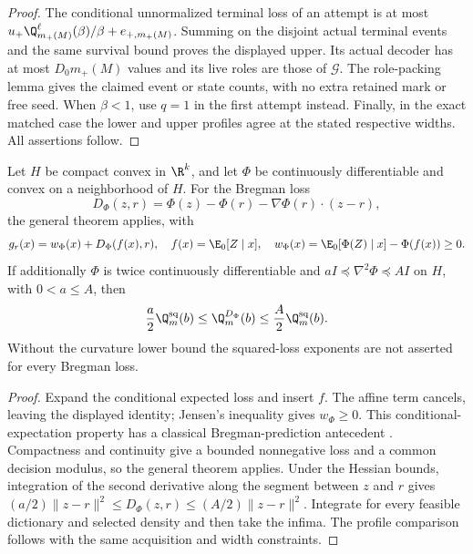 \begin{proof}
The conditional unnormalized terminal loss of an attempt is at most $u_+\Q_{m_+(M)}^\ell(\beta)/\beta+e_{+,m_+(M)}$. Summing on the disjoint actual terminal events and the same survival bound proves the displayed upper. Its actual decoder has at most $D_0m_+(M)$ values and its live roles are those of $\mathcal G$. The role-packing lemma gives the claimed event or state counts, with no extra retained mark or free seed. When $\beta<1$, use $q=1$ in the first attempt instead. Finally, in the exact matched case the lower and upper profiles agree at the stated respective widths. All assertions follow.
\end{proof}

\begin{corollary}\label{cor:bregman-profile}
Let $H$ be compact convex in $\R^k$, and let $\Phi$ be continuously differentiable and convex on a neighborhood of $H$. For the Bregman loss
\[
 D_\Phi(z,r)=\Phi(z)-\Phi(r)-\nabla\Phi(r)\cdot(z-r),
\]
the general theorem applies, with
\begin{equation}\label{eq:Bregman-profile}
 g_r(x)=w_\Phi(x)+D_\Phi(f(x),r),\quad
 f(x)=\E_0[Z\mid x],\quad
 w_\Phi(x)=\E_0[\Phi(Z)\mid x]-\Phi(f(x))\ge0.
\end{equation}
If additionally $\Phi$ is twice continuously differentiable and $aI\preccurlyeq\nabla^2\Phi\preccurlyeq AI$ on $H$, with $0<a\le A$, then
\[
 \frac a2\Q_m^{\rm sq}(b)\le\Q_m^{D_\Phi}(b)
                  \le\frac A2\Q_m^{\rm sq}(b).
\]
Without the curvature lower bound the squared-loss exponents are not asserted for every Bregman loss.
\end{corollary}
\begin{proof}
Expand the conditional expected loss and insert $f$. The affine term cancels, leaving the displayed identity; Jensen's inequality gives $w_\Phi\ge0$. This conditional-expectation property has a classical Bregman-prediction antecedent \cite{Banerjee05}. Compactness and continuity give a bounded nonnegative loss and a common decision modulus, so the general theorem applies. Under the Hessian bounds, integration of the second derivative along the segment between $z$ and $r$ gives $(a/2)\|z-r\|^2\le D_\Phi(z,r)\le(A/2)\|z-r\|^2$. Integrate for every feasible dictionary and selected density and then take the infima. The profile comparison follows with the same acquisition and width constraints.
\end{proof}

